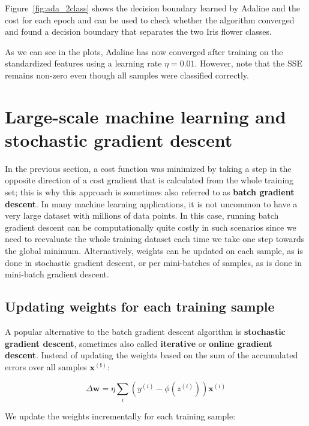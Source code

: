 \documentclass[11pt]{article}
\newcommand{\vect}[1]{\boldsymbol{#1}}
\begin{document}
    Figure~\ref{fig:ada_2class} shows the decision boundary learned by Adaline and the cost for each epoch and can be used to check whether the algorithm converged and found a decision boundary that separates the two Iris flower classes.

    As we can see in the plots, Adaline has now converged after training on the standardized features using a learning rate $\eta=0.01$.
    However, note that the SSE remains non-zero even though all samples were classified correctly.

    \section{Large-scale machine learning and stochastic gradient descent} \label{sec:ada_sgd}

    In the previous section, a cost function was minimized by taking a step in the opposite direction of a cost gradient that is calculated from the whole training set;
    this is why this approach is sometimes also referred to as \textbf{batch gradient descent}.
    In many machine learning applications, it is not uncommon to have a very large dataset with millions of data points.
    In this case, running batch gradient descent can be computationally quite costly in such scenarios since we need to reevaluate the whole training dataset each time we take one step towards the global minimum.
    Alternatively, weights can be updated on each sample, as is done in stochastic gradient descent, or per mini-batches of samples, as is done in mini-batch gradient descent.

    \subsection{Updating weights for each training sample} \label{subsec:ada_sgd}

    A popular alternative to the batch gradient descent algorithm is \textbf{stochastic gradient descent}, sometimes also called \textbf{iterative} or \textbf{online gradient descent}.
    Instead of updating the weights based on the sum of the accumulated errors over all samples $\vect{x^{(i)}}$:

    \begin{equation}
        \Delta \vect{w} = \eta \sum_i \left( y^{(i)} - \phi \left( z^{(i)} \right) \right) \vect{x}^{(i)}
    \end{equation}

    We update the weights incrementally for each training sample:
\end{document}
